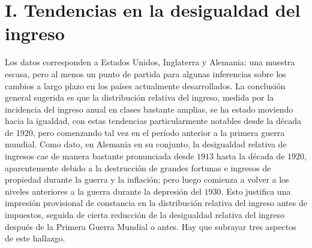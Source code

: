 \section*{I. \centering Tendencias en la desigualdad del ingreso}
Los datos corresponden a Estados Unidos, Inglaterra y Alemania: una muestra escasa, pero al menos un punto de partida para algunas inferencias sobre los cambios a largo plazo en los países actualmente desarrollados. La conclusión general sugerida es que la distribución relativa del ingreso, medida por la incidencia del ingreso anual en clases bastante amplias, se ha estado moviendo hacia la igualdad, con estas tendencias particularmente notables desde la década de 1920, pero comenzando tal vez en el período anterior a la primera guerra mundial. Como dato, en Alemania en su conjunto, la desigualdad relativa de ingresos cae de manera bastante pronunciada desde $1913$ hasta la década de $1920$, aparentemente debido a la destrucción de grandes fortunas e ingresos de propiedad durante la guerra y la inflación; pero luego comienza a volver a los niveles anteriores a la guerra durante la depresión del $1930$. Esto justifica una impresión provisional de constancia en la distribución relativa del ingreso antes de impuestos, seguida de cierta reducción de la desigualdad relativa del ingreso después de la Primera Guerra Mundial o antes. Hay que subrayar tres aspectos de este hallazgo.
